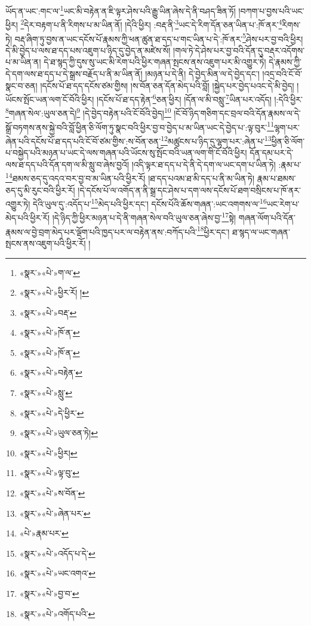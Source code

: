 ཡོད་ན་ཡང་:གང་ལ་\footnote{«སྣར་»«པེ་»ག་ལ་}ཡང་མི་བརྟེན་ན་ཇི་ལྟར་ཤེས་པའི་རྒྱུ་ཡིན་ཞེས་དེ་ནི་བཤད་ཟིན་ཏོ། །བཀག་པ་བྱས་པའི་ཡང་ཕྱིར། \footnote{«སྣར་»«པེ་»ཕྱིར་རོ། ། }དེར་བརྟག་པ་ནི་རིགས་པ་མ་ཡིན་ནོ། །དེའི་ཕྱིར། :བརྡ་ནི་\footnote{«སྣར་»«པེ་»བརྡ་}ཡང་དེ་རིག་དོན་ཅན་ཡིན་པ་:ཁོ་ནར་\footnote{«སྣར་»«པེ་»ཁོ་ན་}རིགས་ཏེ། བརྡ་ཞིག་ཏུ་བྱས་ན་ཡང་དངོས་པོ་རྣམས་ཀྱི་ཕན་ཚུན་ཐ་དད་པ་གང་ཡིན་པ་དེ་:ཁོ་ནར་\footnote{«སྣར་»«པེ་»ཁོ་ན་}ཤེས་པར་བྱ་བའི་ཕྱིར། དེ་མི་བྱེད་པ་ལས་ཐ་དད་པས་འཇུག་པ་ཉིད་དུ་བྱེད་ན་མཛེས་སོ། །གལ་ཏེ་དེ་ཤེས་པར་བྱ་བའི་དོན་དུ་བརྡར་འདོགས་པ་མ་ཡིན་ན། དེ་ཐ་སྙད་ཀྱི་དུས་སུ་ཡང་མི་རེག་པའི་ཕྱིར་གཞན་སྤངས་ནས་འཇུག་པར་མི་འགྱུར་ཏེ། དེ་རྣམས་ཀྱི་དེ་དག་ལས་ཐ་དད་པ་དེ་སྒྲས་བརྗོད་པ་ནི་མ་ཡིན་ནོ། །མཉན་པ་དེ་ནི། དེ་བྱེད་མིན་ལ་དེ་བྱེད་དང་། །འདྲ་བའི་ངོ་བོ་སྣང་བ་ཅན། །དངོས་པོ་ཐ་དད་དངོས་ཙམ་གྱིས། །ས་བོན་ཅན་དོན་མེད་པའི་བློ། །སྐྱེད་པར་བྱེད་པའང་དེ་མི་བྱེད། །ཡོངས་སྤོང་ཡན་ལག་ངོ་བོའི་ཕྱིར། །དངོས་པོ་ཐ་དད་རྟེན་\footnote{«སྣར་»«པེ་»བརྟེན་}ཅན་ཕྱིར། །དོན་ལ་མི་བསླུ་\footnote{«སྣར་»«པེ་»སླུ་}ཡིན་པར་འདོད། །:དེའི་ཕྱིར་\footnote{«སྣར་»«པེ་»དེ་ཕྱིར་}གཞན་སེལ་:ཡུལ་ཅན་དེ།\footnote{«སྣར་»«པེ་»ཡུལ་ཅན་ཏེ།} །དེ་བྱེད་བརྟེན་པའི་ངོ་བོའི་བྱེད།\footnote{«སྣར་»«པེ་»ཕྱིར།} །ངོ་བོ་ཉིད་གཅིག་དང་བྲལ་བའི་དོན་རྣམས་ལ་དེ་སྒྲོ་བཏགས་ནས་སྐྱེ་བའི་བློ་ཕྱིན་ཅི་ལོག་ཏུ་སྣང་བའི་ཕྱིར་བྱ་བ་བྱེད་པ་མ་ཡིན་ཡང་དེ་བྱེད་པ་:ལྟ་བུར་\footnote{«སྣར་»«པེ་»ལྟ་བུ་}ལྷག་པར་ཞེན་པའི་དངོས་པོ་ཐ་དད་པའི་ངོ་བོ་ཙམ་གྱིས་:ས་བོན་ཅན་\footnote{«སྣར་»«པེ་»ས་བོན་}མཚུངས་པ་ཉིད་དུ་ལྷག་པར་:ཞེན་པ་\footnote{«སྣར་»«པེ་»ཞེན་པར་}ཕྱིན་ཅི་ལོག་པ་བསྐྱེད་པའི་མཉན་པ་ཡང་དེ་ལས་གཞན་པའི་ཡོངས་སུ་སྤོང་བའི་ཡན་ལག་གི་ངོ་བོའི་ཕྱིར། དོན་དམ་པར་དེ་ལས་ཐ་དད་པའི་དོན་དག་ལ་མི་སླུ་བ་ཞེས་བྱའོ། །འདི་ལྟར་ཐ་དད་པ་དེ་ནི་དེ་དག་ལ་ཡང་དག་པ་ཡིན་ཏེ། :རྣམ་པ་\footnote{«པེ་»རྣམ་པར་}ཐམས་ཅད་དུ་འདའ་བར་བྱ་བ་མ་ཡིན་པའི་ཕྱིར་རོ། །ཐ་དད་པའམ་ཐ་མི་དད་པ་ནི་མ་ཡིན་ཏེ། རྣམ་པ་ཐམས་ཅད་དུ་མི་རུང་བའི་ཕྱིར་རོ། །དེ་དངོས་པོ་ལ་འགོད་ན་ནི་སྒྲ་དང་ཤེས་པ་དག་ལས་དངོས་པོ་ཐག་བསྲིངས་པ་ཁོ་ནར་འགྱུར་ཏེ། དེའི་ཡུལ་དུ་:འདོད་པ་\footnote{«སྣར་»«པེ་»འདོད་པ་དེ་}མེད་པའི་ཕྱིར་དང་། དངོས་པོའི་ཆོས་གཞན་:ཡང་འགགས་ལ་\footnote{«སྣར་»«པེ་»ཡང་འགའ་}ཡང་རེག་པ་མེད་པའི་ཕྱིར་རོ། །དེ་ཉིད་ཀྱི་ཕྱིར་མཉན་པ་དེ་ནི་གཞན་སེལ་བའི་ཡུལ་ཅན་ཞེས་བྱ་\footnote{«སྣར་»«པེ་»བྱ་བ་}སྟེ། གཞན་ལོག་པའི་དོན་རྣམས་ལ་བྱེ་བྲག་མེད་པར་ལྡོག་པའི་ཁྱད་པར་ལ་བརྟེན་ནས་:བཀོད་པའི་\footnote{«སྣར་»«པེ་»འགོད་པའི་}ཕྱིར་དང་། ཐ་སྙད་ལ་ཡང་གཞན་སྤངས་ནས་འཇུག་པའི་ཕྱིར་རོ། །
